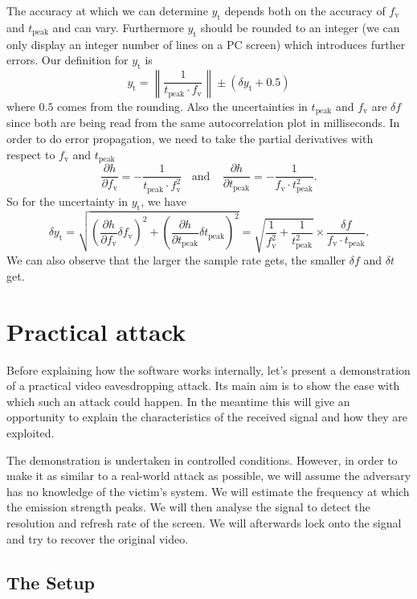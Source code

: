 \documentclass[a4paper,12pt,twoside,openright]{report}
\begin{document}
The accuracy at which we can determine $y_\text{t}$ depends both on the accuracy of $f_\text{v}$ and $t_\text{peak}$ and can vary. Furthermore $y_\text{t}$ should be rounded to an integer (we can only display an integer number of lines on a PC screen) which introduces further errors. Our definition for $y_\text{t}$ is
$$y_\text{t} = \left\| \frac{1}{t_\text{peak} \cdot f_\text{v}} \right\| \pm (\delta y_\text{t} + 0.5)$$
where $0.5$ comes from the rounding. Also the uncertainties in $t_\text{peak}$ and $f_\text{v}$ are $\delta f$ since both are being read from the same autocorrelation plot in milliseconds. In order to do error propagation, we need to take the partial derivatives with respect to $f_\text{v}$ and $t_\text{peak}$
$$\frac{\partial h}{\partial f_\text{v}} = - \frac{1}{t_\text{peak} \cdot f_\text{v}^2}
 \,\,\,\,\ \text{and} \,\,\,\,\ \
\frac{\partial h}{\partial t_\text{peak}} = - \frac{1}{f_\text{v} \cdot t_\text{peak}^2} .$$
So for the uncertainty in $y_\text{t}$, we have
$$\delta y_\text{t} =
\sqrt{\left( \frac{\partial h}{\partial f_\text{v}} \delta f_\text{v} \right)^2 + \left( \frac{\partial h}{\partial t_\text{peak}} \delta t_\text{peak} \right)^2} = 
\sqrt{\frac{1}{f_\text{v}^2} + \frac{1}{t_\text{peak}^2}} \times \frac{\delta f}{f_\text{v} \cdot t_\text{peak}} .$$
We can also observe that the larger the sample rate gets, the smaller $\delta f$ and $\delta t$ get.

\chapter{Practical attack} 

Before explaining how the software works internally, let's present a demonstration of a practical video eavesdropping attack. Its main aim is to show the ease with which such an attack could happen. In the meantime this will give an opportunity to explain the characteristics of the received signal and how they are exploited.

The demonstration is undertaken in controlled conditions. However, in order to make it as similar to a real-world attack as possible, we will assume the adversary has no knowledge of the victim's system. We will estimate the frequency at which the emission strength peaks. We will then analyse the signal to detect the resolution and refresh rate of the screen. We will afterwards lock onto the signal and try to recover the original video.

\section{The Setup}
\end{document}

